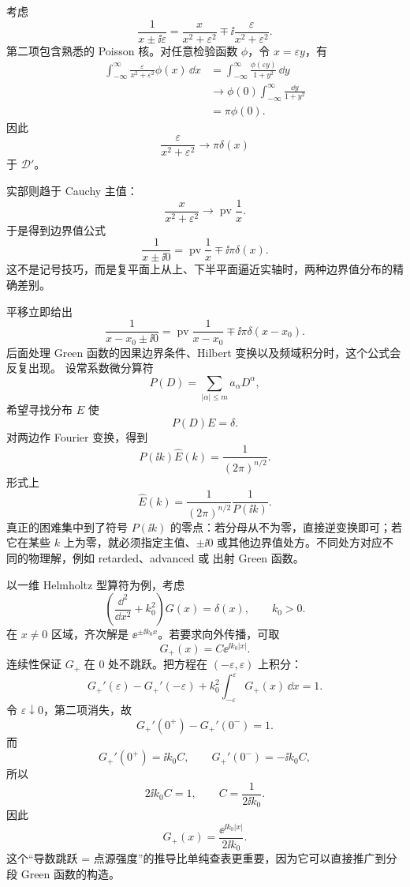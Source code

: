 考虑
\[
\frac1{x\pm \ii\varepsilon}
=\frac{x}{x^2+\varepsilon^2}
\mp \ii\frac{\varepsilon}{x^2+\varepsilon^2}.
\]
第二项包含熟悉的 Poisson 核。对任意检验函数 $\phi$，令 $x=\varepsilon y$，有
\[
\begin{aligned}
\int_{-\infty}^{\infty}
\frac{\varepsilon}{x^2+\varepsilon^2}\phi(x)\,\dd x
&=\int_{-\infty}^{\infty}\frac{\phi(\varepsilon y)}{1+y^2}\,\dd y\\
&\longrightarrow \phi(0)\int_{-\infty}^{\infty}\frac{\dd y}{1+y^2}\\
&=\pi\phi(0).
\end{aligned}
\]
因此
\[
\frac{\varepsilon}{x^2+\varepsilon^2}
\longrightarrow \pi\delta(x)
\]
于 $\mathcal D'$。

实部则趋于 Cauchy 主值：
\[
\frac{x}{x^2+\varepsilon^2}
\longrightarrow \operatorname{pv}\frac1x.
\]
于是得到边界值公式
\begin{equation*}{
\frac1{x\pm \ii 0}
=\operatorname{pv}\frac1x\mp \ii\pi\delta(x)
}.\end{equation*}
这不是记号技巧，而是复平面上从上、下半平面逼近实轴时，两种边界值分布的精确差别。

平移立即给出
\[
\frac1{x-x_0\pm \ii 0}
=\operatorname{pv}\frac1{x-x_0}\mp \ii\pi\delta(x-x_0).
\]
后面处理 Green 函数的因果边界条件、Hilbert 变换以及频域积分时，这个公式会反复出现。
设常系数微分算符
\[
P(D)=\sum_{|\alpha|\le m}a_\alpha D^\alpha,
\]
希望寻找分布 $E$ 使
\[
P(D)E=\delta.
\]
对两边作 Fourier 变换，得到
\[
P(\ii k)\widehat E(k)=\frac1{(2\pi)^{n/2}}.
\]
形式上
\begin{equation*}{
\widehat E(k)
=\frac1{(2\pi)^{n/2}}\frac1{P(\ii k)}
}.\end{equation*}
真正的困难集中到了符号 $P(\ii k)$ 的零点：若分母从不为零，直接逆变换即可；若它在某些 $k$ 上为零，就必须指定主值、$\pm \ii 0$ 或其他边界值处方。不同处方对应不同的物理解，例如 retarded、advanced 或 出射 Green 函数。

以一维 Helmholtz 型算符为例，考虑
\[
\left(\frac{\dd^2}{\dd x^2}+k_0^2\right)G(x)=\delta(x),
\qquad k_0>0.
\]
在 $x\neq0$ 区域，齐次解是 $\ee^{\pm \ii k_0x}$。若要求向外传播，可取
\[
G_+(x)=C \ee^{\ii k_0|x|}.
\]
连续性保证 $G_+$ 在 $0$ 处不跳跃。把方程在 $(-\varepsilon,\varepsilon)$ 上积分：
\[
G_+'(\varepsilon)-G_+'(-\varepsilon)
+k_0^2\int_{-\varepsilon}^{\varepsilon}G_+(x)\,\dd x=1.
\]
令 $\varepsilon\downarrow0$，第二项消失，故
\[
G_+'(0^+)-G_+'(0^-)=1.
\]
而
\[
G_+'(0^+)=\ii k_0C,
\qquad
G_+'(0^-)=-\ii k_0C,
\]
所以
\[
2\ii k_0C=1,
\qquad
C=\frac1{2\ii k_0}.
\]
因此
\begin{equation*}{
G_+(x)=\frac{\ee^{\ii k_0|x|}}{2\ii k_0}
}.\end{equation*}
这个“导数跳跃 = 点源强度”的推导比单纯查表更重要，因为它可以直接推广到分段 Green 函数的构造。

